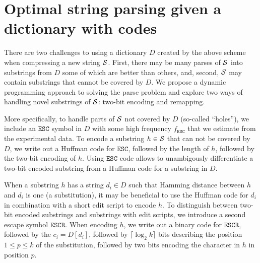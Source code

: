 \documentclass[12pt]{cmuthesis}
\begin{document}


\section{Optimal string parsing given a dictionary with codes}

  \newcommand{\esc}{\texttt{ESC}\xspace}
  \newcommand{\escremap}{\texttt{ESCR}\xspace}


  There are two challenges to using a dictionary $D$ created by the above scheme when compressing a new string $\mathcal{S}$. First, there may be many parses of $\mathcal{S}$ into substrings from $D$ some of which are better than others, and, second, $\mathcal{S}$ may contain substrings that cannot be covered by $D$. We propose a dynamic programming approach to solving the parse problem and explore two ways of handling novel substrings of $\mathcal{S}$: two-bit encoding and remapping.

  More specifically, to handle parts of $\mathcal{S}$ not covered by $D$ (so-called ``holes''), we include an $\esc$ symbol in $D$ with some high frequency $f_{\esc}$ that we estimate from the experimental data. To encode a substring $h \in \mathcal{S}$ that can not be covered by $D$, we write out a Huffman code for $\esc$, followed by the length of $h$, followed by the two-bit encoding of $h$. Using $\esc$ code allows to unambigously differentiate a two-bit encoded substring from a Huffman code for a substring in $D$.

  When a substring $h$ has a string $d_i \in D$ such that Hamming distance between $h$ and $d_i$ is one (a substitution), it may be beneficial to use the Huffman code for $d_i$ in combination with a short edit script to encode $h$. To distinguish between two-bit encoded substrings and substrings with edit scripts, we introduce a second escape symbol $\escremap$. When encoding $h$, we write out a binary code for $\escremap$, followed by the $c_i = D[d_i]$, followed by $\lceil \log_2 k \rceil$ bits describing the position $1 \leq p \leq k$ of the substitution, followed by two bits encoding the character in $h$ in position $p$.

\end{document}
